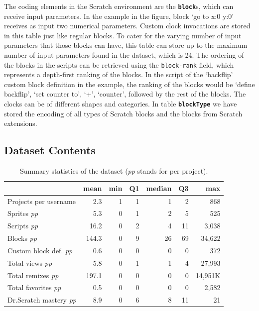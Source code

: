 \documentclass[10pt, conference]{IEEEtran}
\begin{document}
The coding elements in the Scratch environment are the \textbf{\texttt{block}}s, which can receive input parameters.
In the example in the figure, block `go to x:0 y:0' receives as input two numerical parameters.
Custom clock invocations are stored in this table just like regular blocks.
To cater for the varying number of input parameters that those blocks can have, this table can store up to the maximum number of input parameters found in the dataset, which is 24.
The ordering of the blocks in the scripts can be retrieved using the \texttt{block-rank} field, which represents a depth-first ranking of the blocks.
In the script of the `backflip' custom block definition in the example, the ranking of the blocks would be `define backflip', `set counter to', `+', `counter', followed by the rest of the blocks.
The clocks can be of different shapes and categories.
In table \textbf{\texttt{blockType}} we have stored the encoding of all types of Scratch blocks and the blocks from Scratch extensions.

\subsection{Dataset Contents}


\begin{table}[]
	\centering
	\begin{tabular}{lrrrrrr}
		&\textbf{mean}&\textbf{min}&\textbf{Q1}&\textbf{median}&\textbf{Q3}&\textbf{max}\\
		\hline
		Projects per username&2.3&1&1&1&2&868\\
		Sprites \emph{pp}&5.3&0&1&2&5&525\\
		Scripts \emph{pp}&16.2&0&2&4&11&3,038\\
		Blocks \emph{pp}&144.3&0&9&26&69&34,622\\
		Custom block def. \emph{pp}&0.6&0&0&0&0&372\\
		Total views \emph{pp}&5.8&0&1&1&4&27,993\\
		Total remixes \emph{pp}&197.1&0&0&0&0&14,951K \\ %
		Total favorites \emph{pp}&0.5&0&0&0&0&2,582\\
		Dr.Scratch mastery \emph{pp}&8.9&0&6&8&11&21\\
		\hline
	\end{tabular}
	\caption{Summary statistics of the dataset (\emph{pp} stands for per project).}
	\label{tbl-stats}
\end{table}
\end{document}
